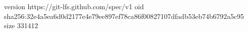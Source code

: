 version https://git-lfs.github.com/spec/v1
oid sha256:32e4a5ea6d0d2177e4e79ee897ef78ca86f00827107dfadb53eb74b6792a5c95
size 331412
